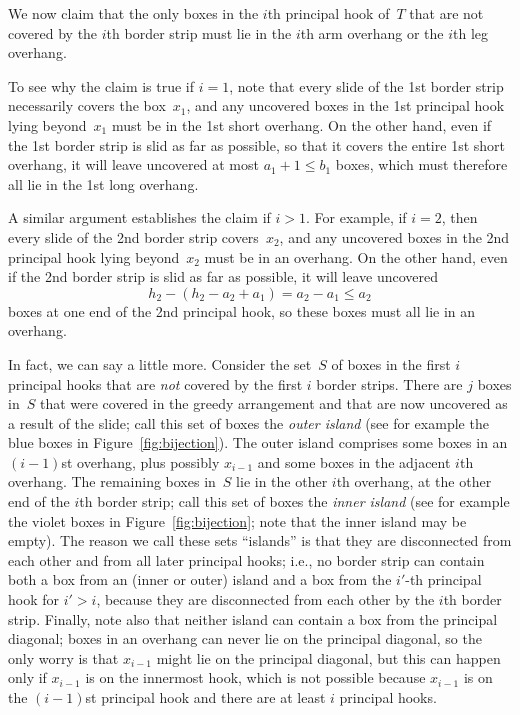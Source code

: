 \documentclass[12pt]{article}
\theoremstyle{definition}
\begin{document}
 We now claim that the only boxes in the $i$th principal hook
of~$T$ that are not covered by the $i$th border strip
must lie in the $i$th arm overhang or the $i$th leg overhang.


To see why the claim is true if $i=1$,
note that every slide of the 1st border strip
necessarily covers the box~$x_1$,
and any uncovered boxes in the 1st principal hook
lying beyond~$x_1$ must be in the 1st short overhang.
On the other hand, 
even if the 1st border strip is slid as far as possible,
so that it covers the entire 1st short overhang,
it will leave uncovered at most $a_1 + 1 \le b_1$ boxes,
which must therefore all lie in the 1st long overhang.


A similar argument establishes the claim if $i>1$.
For example, if $i=2$, then every slide of the 2nd border strip
covers~$x_2$, and any uncovered boxes in the 2nd principal hook
lying beyond~$x_2$ must be in an overhang.
On the other hand, even if the 2nd border strip is slid as far
as possible, it will leave uncovered
\begin{equation*}
h_2 - (h_2 - a_2 + a_1) = a_2 - a_1 \le a_2
\end{equation*}
boxes at one end of the 2nd principal hook,
so these boxes must all lie in an overhang.


In fact, we can say a little more.
Consider the set~$S$ of boxes in the first $i$ principal hooks
that are \emph{not} covered by the first $i$ border strips.
There are $j$ boxes in~$S$ that were covered in the greedy
arrangement and that are now uncovered as a result of the slide;
call this set of boxes the \emph{outer island}
(see for example the blue boxes in Figure~\ref{fig:bijection}).
The outer island comprises some boxes in an $(i-1)$st overhang,
plus possibly $x_{i-1}$ and some boxes in the adjacent $i$th overhang.
The remaining boxes in~$S$ lie in the other $i$th overhang,
at the other end of the $i$th border strip;
call this set of boxes the \emph{inner island}
(see for example the violet boxes in Figure~\ref{fig:bijection};
note that the inner island may be empty).
The reason we call these sets ``islands''
is that they are disconnected from each other
and from all later principal hooks;
i.e., no border strip can contain both a box from an
(inner or outer) island and a box from the $i'$-th principal
hook for $i'>i$,
because they are disconnected from each other by
the $i$th border strip.
Finally, note also that neither island can contain
a box from the principal diagonal;
boxes in an overhang can never lie on the principal diagonal,
so the only worry is that $x_{i-1}$ might lie on the principal diagonal,
but this can happen only if $x_{i-1}$ is on the innermost hook,
which is not possible because $x_{i-1}$ is on the
$(i-1)$st principal hook
and there are at least $i$ principal hooks.
\end{document}
